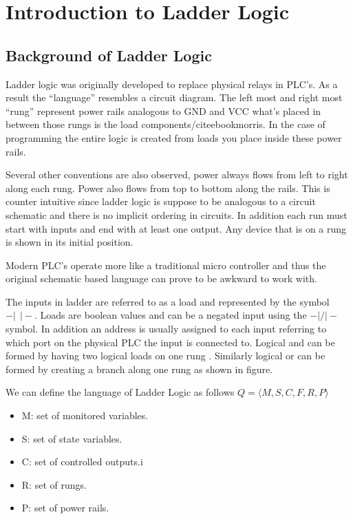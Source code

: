 
\chapter{Introduction to Ladder Logic}
\section{Background of Ladder Logic}
\label{section:ladderlogic}

Ladder logic was originally developed to replace physical relays in PLC's.
As a result the ``language'' resembles a circuit diagram. The left most
and right most ``rung'' represent power rails analogous to GND and VCC what's
placed in between those rungs is the load components/cite{ebookmorris}. In 
the case of programming the entire logic is created from loads you place 
inside these power rails. 

Several other conventions are also observed, power always flows from left 
to right along each rung. Power also flows from top to bottom along the 
rails. This is counter intuitive since ladder logic is suppose to be 
analogous to a circuit schematic and there is no implicit
ordering in circuits. In addition each run must start with inputs and end
with at least one output. Any device that is on a rung is shown in its
initial position.

Modern PLC's operate more like a traditional micro controller and thus the 
original schematic based language can prove to be awkward to work with.

The inputs in ladder are referred to as a load and represented by the 
symbol $-\vert ~ ~ \vert-$. %
Loads are boolean values and can be a negated input using the $-\vert/\vert-$ symbol. 
In addition an address is usually assigned to each input referring to 
which port on the physical PLC the input is connected to. Logical and 
can be formed by having two logical loads on one rung \cite{ebookmorris}. 
Similarly logical or can be formed by creating a branch along one 
rung as shown in figure. %

We can define the language of Ladder Logic as follows $Q = \langle M,S,C,F,R,P \rangle $

\begin{itemize}
	\item M: set of monitored variables.
	\item S: set of state variables.
	\item C: set of controlled outputs.i
	\item R: set of rungs.
	\item P: set of power rails.
\end{itemize}

